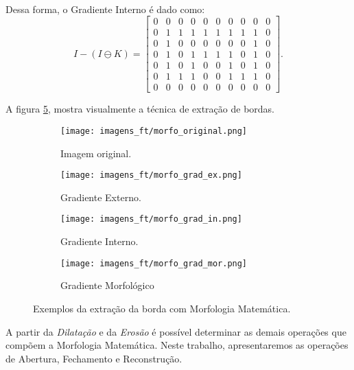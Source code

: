 \begin{exemplo}
\begin{multline}
	\end{multline}
	\noindent Dessa forma, o Gradiente Interno é dado como: 
	\begin{displaymath}
		I - (I \ominus K) = \begin{bmatrix}
			0 & 0 & 0 & 0 & 0 & 0 & 0 & 0 & 0 & 0 \\
			0 & 1 & 1 & 1 & 1 & 1 & 1 & 1 & 1 & 0 \\
			0 & 1 & 0 & 0 & 0 & 0 & 0 & 0 & 1 & 0 \\
			0 & 1 & 0 & 1 & 1 & 1 & 1 & 0 & 1 & 0 \\
			0 & 1 & 0 & 1 & 0 & 0 & 1 & 0 & 1 & 0 \\
			0 & 1 & 1 & 1 & 0 & 0 & 1 & 1 & 1 & 0 \\
			0 & 0 & 0 & 0 & 0 & 0 & 0 & 0 & 0 & 0 
		\end{bmatrix}.
	\end{displaymath}
\end{exemplo}

A figura \ref{fig:gradiente}, mostra visualmente a técnica de extração de bordas.

\begin{figure}[h]
	\centering
	\begin{subfigure}[b]{0.4\textwidth}
		\centering
		\texttt{[image: imagens\_ft/morfo\_original.png]}
		\caption{Imagem original.}
		\label{fig:original3}
	\end{subfigure}
	\hfill
	\begin{subfigure}[b]{0.4\textwidth}
		\centering
		\texttt{[image: imagens\_ft/morfo\_grad\_ex.png]}
		\caption{Gradiente Externo.}
		\label{fig:grad_externo}
	\end{subfigure}
	\hfill
	\begin{subfigure}[b]{0.4\textwidth}
		\centering
		\texttt{[image: imagens\_ft/morfo\_grad\_in.png]}
		\caption{Gradiente Interno.}
		\label{fig:grad_in}
	\end{subfigure}
	\hfill
	\begin{subfigure}[b]{0.4\textwidth}
		\centering
		\texttt{[image: imagens\_ft/morfo\_grad\_mor.png]}
		\caption{Gradiente Morfológico}
		\label{fig:grad_mor}
	\end{subfigure}
	\caption{Exemplos da extração da borda com Morfologia Matemática.}
	\label{fig:gradiente}
\end{figure}

A partir da \textit{Dilatação} e da \textit{Erosão} é possível determinar as demais operações que compõem a Morfologia Matemática. Neste trabalho, apresentaremos as operações de Abertura, Fechamento e Reconstrução. 

